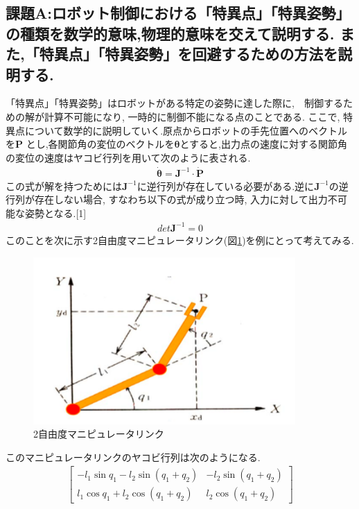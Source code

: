 \documentclass[a4paper,11pt,titlepage]{jsarticle}
\begin{document}
{\subsection{課題A:ロボット制御における「特異点」「特異姿勢」の種類を数学的意味,物理的意味を交えて説明する.
また,「特異点」「特異姿勢」を回避するための方法を説明する.}
「特異点」「特異姿勢」はロボットがある特定の姿勢に達した際に,　制御するための解が計算不可能になり, 一時的に制御不能になる点のことである.
ここで, 特異点について数学的に説明していく.原点からロボットの手先位置へのベクトルを$\bm{P}$
とし,各関節角の変位のベクトルを$\bm{\theta}$とすると,出力点の速度に対する関節角の変位の速度はヤコビ行列を用いて次のように表される.
\begin{align}
  \bm{\dot{\theta}} = \bm{J}^{-1} \cdot \bm{\dot{P}}
\end{align}
この式が解を持つためには$\bm{J}^{-1}$に逆行列が存在している必要がある.逆に$\bm{J}^{-1}$の逆行列が存在しない場合,
すなわち以下の式が成り立つ時, 入力に対して出力不可能な姿勢となる.[1]
\begin{align}
  det\bm{J}^{-1} = 0
\end{align}
このことを次に示す2自由度マニピュレータリンク(図\ref{2自由度})を例にとって考えてみる.
\begin{figure}[H]
  \begin{center}
    \includegraphics[width = 10cm]{画像/2自由度.png}
    \caption{2自由度マニピュレータリンク}
    \label{2自由度}
  \end{center}
\end{figure}
このマニピュレータリンクのヤコビ行列は次のようになる.
\begin{align}
  \left[
	\begin{array}{cc}
		-l_1\sin{q_1}-l_2\sin(q_1+q_2) & -l_2\sin(q_1+q_2) \\
    l_1\cos{q_1}+l_2\cos(q_1+q_2) & l_2\cos(q_1+q_2)
	\end{array}
	\right]
\end{align}
}
\end{document}
